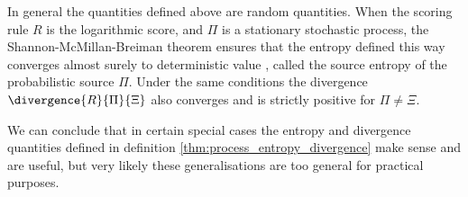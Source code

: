 In general the quantities defined above are random quantities. When the scoring rule $R$ is the logarithmic score, and $\Pi$ is a stationary stochastic process, the Shannon-McMillan-Breiman theorem ensures that the entropy defined this way converges almost surely to deterministic value \cite{}, called the source entropy of the probabilistic source $\Pi$. Under the same conditions the divergence $\divergence{R}{\Pi}{\Xi}$ also converges and is strictly positive for $\Pi \neq \Xi$.

We can conclude that in certain special cases the entropy and divergence quantities defined in definition \ref{thm:process_entropy_divergence} make sense and are useful, but very likely these generalisations are too general for practical purposes.